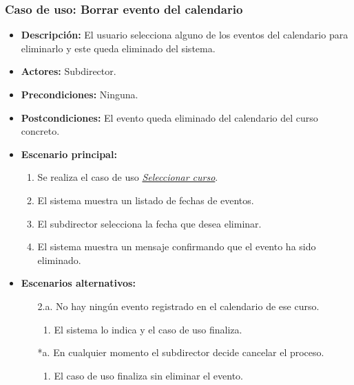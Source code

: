 \documentclass{book}
\begin{document}
\subsubsection*{Caso de uso: Borrar evento del calendario}
\begin{itemize}
\item{\bf Descripción:} El usuario selecciona alguno de los eventos del calendario para eliminarlo y este queda eliminado del sistema.
\item{\bf Actores:} Subdirector.
\item{\bf Precondiciones:} Ninguna.
\item{\bf Postcondiciones:} El evento queda eliminado del calendario del curso concreto.
\item{\bf Escenario principal:}
	\begin{enumerate}
	\item Se realiza el caso de uso {\em \hyperref[select_curso]{Seleccionar curso}}.
	\item El sistema muestra un listado de fechas de eventos.
	\item El subdirector selecciona la fecha que desea eliminar.
	\item El sistema muestra un mensaje confirmando que el evento ha sido eliminado.
	\end{enumerate}
\item{\bf Escenarios alternativos:}
	\begin{itemize}
		\item[2.a.] No hay ningún evento registrado en el calendario de ese curso.
		\begin{enumerate}
			\item El sistema lo indica y el caso de uso finaliza.
		\end{enumerate}
		\item[*a.] En cualquier momento el subdirector decide cancelar el proceso.
		\begin{enumerate}
		\item El caso de uso finaliza sin eliminar el evento.
		\end{enumerate}
	\end{itemize}
\end{itemize}
\end{document}
